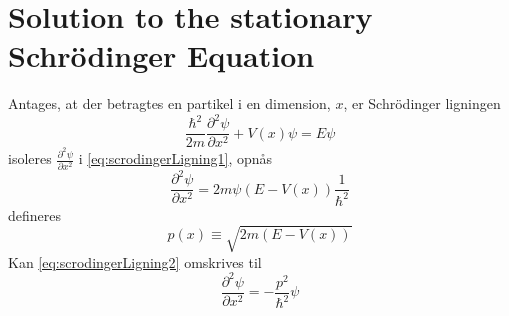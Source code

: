 \section{Solution to the stationary Schrödinger Equation}
Antages, at der betragtes en partikel i en dimension, $x$,  er Schrödinger ligningen
\begin{equation}
    \frac{\hbar^2}{2m}\frac{\partial^2 \psi}{\partial x^2} + V(x) \psi = E \psi
    \label{eq:scrodingerLigning1}
\end{equation}
isoleres $\frac{\partial^2 \psi}{\partial x^2}$ i \cref{eq:scrodingerLigning1}, opnås
\begin{equation}
    \frac{\partial^2 \psi}{\partial x^2} = 2m\psi (E  - V(x)) \frac{1}{\hbar^2}
    \label{eq:scrodingerLigning2}
\end{equation}
defineres
\begin{equation}
p(x) \equiv \sqrt{2m(E-V(x))}
\end{equation}
Kan \cref{eq:scrodingerLigning2} omskrives til
\begin{equation}
    \frac{\partial^2 \psi}{\partial x^2} = - \frac{p^2}{\hbar^2} \psi
    \label{eq:scrodingerLigning3}
\end{equation}
